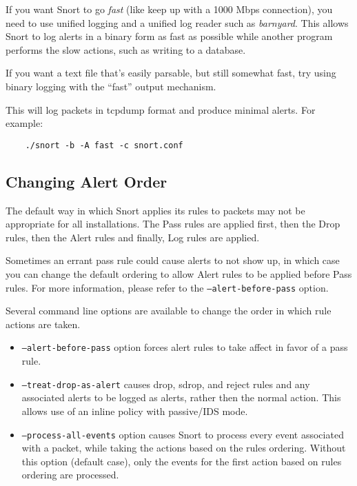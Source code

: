 \documentclass[english]{report}
\newenvironment{note}{
\samepage
    \vspace{10pt}{\textsf{
        {\hspace{7pt}\Huge{$\triangle$\hspace{-12.5pt}{\Large{$^!$}}}}\hspace{5pt}
        {\Large{NOTE}}
    }
    }
   \begin{center}
    \par\vspace{-17pt}

    \begin{lrbox}{\savepar}
    \begin{minipage}[r]{6in}
}
{
    \end{minipage}
    \end{lrbox}
    \fbox{
        \usebox{
            \savepar
	}
    }
    \par\vskip10pt
    \end{center}
}
\newenvironment{note}{
        \begin{rawhtml}
        <p><table border="1"><tr><td><b>
        Note:&nbsp;&nbsp;</b>
        \end{rawhtml}
}{
        \begin{rawhtml}
        </b></td></tr></table></p>
        \end{rawhtml}
}
\begin{document}
If you want Snort to go \emph{fast} (like keep up with a 1000 Mbps connection),
you need to use unified logging and a unified log reader such as
\emph{barnyard}.  This allows Snort to log alerts in a binary form as fast as
possible while another program performs the slow actions, such as writing to a
database.

If you want a text file that's easily parsable, but still somewhat fast, try
using binary logging with the ``fast'' output mechanism. 

This will log packets in tcpdump format and produce minimal alerts. For
example:

\begin{verbatim}
    ./snort -b -A fast -c snort.conf
\end{verbatim}

\subsection{Changing Alert Order}

The default way in which Snort applies its rules to packets may not be
appropriate for all installations.  The Pass rules are applied first, then the
Drop rules, then the Alert rules and finally, Log rules are applied. 

\begin{note}
Sometimes an errant pass rule could cause alerts to not show up, in
which case you can change the default ordering to allow Alert rules
to be applied before Pass rules.  For more information, please refer
to the \texttt{--alert-before-pass} option.
\end{note}

Several command line options are available to change the order in
which rule actions are taken.

\begin{itemize}

\item \texttt{--alert-before-pass} option forces alert rules to take
affect in favor of a pass rule.

\item \texttt{--treat-drop-as-alert} causes drop, sdrop, and reject
rules and any associated alerts to be logged as alerts, rather then the
normal action.  This allows use of an inline policy with passive/IDS mode.

\item \texttt{--process-all-events} option causes Snort to process
every event associated with a packet, while taking the actions based
on the rules ordering.  Without this option (default case), only the
events for the first action based on rules ordering are processed.

\end{itemize}
\end{document}
